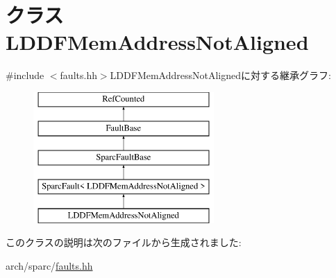 \hypertarget{classSparcISA_1_1LDDFMemAddressNotAligned}{
\section{クラス LDDFMemAddressNotAligned}
\label{classSparcISA_1_1LDDFMemAddressNotAligned}
}


{\ttfamily \#include $<$faults.hh$>$}LDDFMemAddressNotAlignedに対する継承グラフ:\begin{figure}[H]
\begin{center}
\leavevmode
\includegraphics[height=5cm]{classSparcISA_1_1LDDFMemAddressNotAligned}
\end{center}
\end{figure}


このクラスの説明は次のファイルから生成されました:\begin{DoxyCompactItemize}
\item 
arch/sparc/\hyperlink{arch_2sparc_2faults_8hh}{faults.hh}\end{DoxyCompactItemize}
